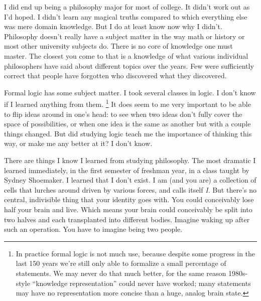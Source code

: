 I did end up being a philosophy major for most of college. It didn't
work out as I'd hoped. I didn't learn any magical truths compared to
which everything else was mere domain knowledge. But I do at least know
now why I didn't. Philosophy doesn't really have a subject matter in the
way math or history or most other university subjects do. There is no
core of knowledge one must master. The closest you come to that is a
knowledge of what various individual philosophers have said about
different topics over the years. Few were sufficiently correct that
people have forgotten who discovered what they discovered.

Formal logic has some subject matter. I took several classes in logic. I
don't know if I learned anything from them. \footnote{In practice formal logic is not much use, because despite some
progress in the last 150 years we're still only able to formalize a
small percentage of statements. We may never do that much better, for
the same reason 1980s-style ``knowledge representation'' could never
have worked; many statements may have no representation more concise
than a huge, analog brain state.} It
does seem to me very important to be able to flip ideas around in one's
head: to see when two ideas don't fully cover the space of
possibilities, or when one idea is the same as another but with a couple
things changed. But did studying logic teach me the importance of
thinking this way, or make me any better at it? I don't know.

There are things I know I learned from studying philosophy. The most
dramatic I learned immediately, in the first semester of freshman year,
in a class taught by Sydney Shoemaker. I learned that I don't exist. I
am (and you are) a collection of cells that lurches around driven by
various forces, and calls itself \emph{I}. But there's no central,
indivisible thing that your identity goes with. You could conceivably
lose half your brain and live. Which means your brain could conceivably
be split into two halves and each transplanted into different bodies.
Imagine waking up after such an operation. You have to imagine being two
people.


